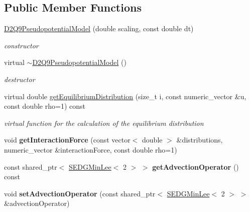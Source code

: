 \subsection*{Public Member Functions}
\begin{DoxyCompactItemize}
\item 
\hypertarget{classnatrium_1_1D2Q9PseudopotentialModel_af533d01219626d11d9f2cf296aa7cc63}{\hyperlink{classnatrium_1_1D2Q9PseudopotentialModel_af533d01219626d11d9f2cf296aa7cc63}{D2\-Q9\-Pseudopotential\-Model} (double scaling, const double dt)}\label{classnatrium_1_1D2Q9PseudopotentialModel_af533d01219626d11d9f2cf296aa7cc63}

\begin{DoxyCompactList}\small\item\em constructor \end{DoxyCompactList}\item 
\hypertarget{classnatrium_1_1D2Q9PseudopotentialModel_ac8cdc8eb6e099490819423455325ecbb}{virtual \hyperlink{classnatrium_1_1D2Q9PseudopotentialModel_ac8cdc8eb6e099490819423455325ecbb}{$\sim$\-D2\-Q9\-Pseudopotential\-Model} ()}\label{classnatrium_1_1D2Q9PseudopotentialModel_ac8cdc8eb6e099490819423455325ecbb}

\begin{DoxyCompactList}\small\item\em destructor \end{DoxyCompactList}\item 
virtual double \hyperlink{classnatrium_1_1D2Q9PseudopotentialModel_a54a15a3c9590e7c40b4b3052fcb7319e}{get\-Equilibrium\-Distribution} (size\-\_\-t i, const numeric\-\_\-vector \&u, const double rho=1) const 
\begin{DoxyCompactList}\small\item\em virtual function for the calculation of the equilibrium distribution \end{DoxyCompactList}\item 
\hypertarget{classnatrium_1_1D2Q9PseudopotentialModel_aa74c0b3299f15d9830cf427b4d61bd68}{void {\bfseries get\-Interaction\-Force} (const vector$<$ double $>$ \&distributions, numeric\-\_\-vector \&interaction\-Force, const double rho=1)}\label{classnatrium_1_1D2Q9PseudopotentialModel_aa74c0b3299f15d9830cf427b4d61bd68}

\item 
\hypertarget{classnatrium_1_1D2Q9PseudopotentialModel_ae8ac734b4cfb98151ed7daa8a9af3af2}{const shared\-\_\-ptr$<$ \hyperlink{classnatrium_1_1SEDGMinLee}{S\-E\-D\-G\-Min\-Lee}$<$ 2 $>$ $>$ {\bfseries get\-Advection\-Operator} () const }\label{classnatrium_1_1D2Q9PseudopotentialModel_ae8ac734b4cfb98151ed7daa8a9af3af2}

\item 
\hypertarget{classnatrium_1_1D2Q9PseudopotentialModel_a192ab3089f17ae9cb95557e03a6a5eaf}{void {\bfseries set\-Advection\-Operator} (const shared\-\_\-ptr$<$ \hyperlink{classnatrium_1_1SEDGMinLee}{S\-E\-D\-G\-Min\-Lee}$<$ 2 $>$ $>$ \&advection\-Operator)}\label{classnatrium_1_1D2Q9PseudopotentialModel_a192ab3089f17ae9cb95557e03a6a5eaf}

\end{DoxyCompactItemize}

